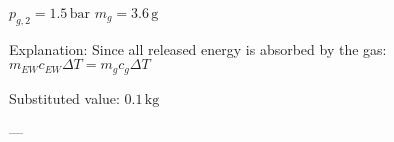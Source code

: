 \( p_{g,2} = 1.5 \, \text{bar} \)  
\( m_g = 3.6 \, \text{g} \)  

Explanation:  
Since all released energy is absorbed by the gas:  
\( m_{EW} c_{EW} \Delta T = m_g c_g \Delta T \)  

Substituted value:  
\( 0.1 \, \text{kg} \)  

---